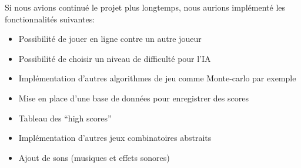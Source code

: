Si nous avions continué le projet plus longtemps, nous aurions implémenté les fonctionnalités suivantes:

\begin{itemize}
    \item Possibilité de jouer en ligne contre un autre joueur
    \item Possibilité de choisir un niveau de difficulté pour l'IA
    \item Implémentation d'autres algorithmes de jeu comme Monte-carlo par exemple
    \item Mise en place d'une base de données pour enregistrer des scores
    \item Tableau des ``high scores''
    \item Implémentation d'autres jeux combinatoires abstraits
    \item Ajout de sons (musiques et effets sonores)
\end{itemize}
